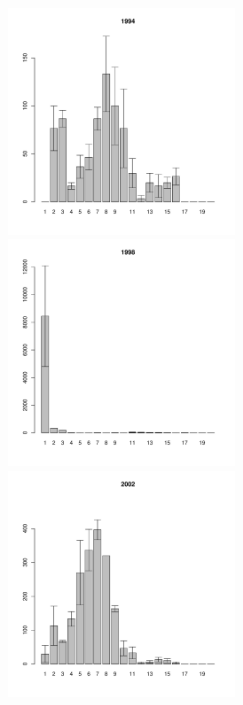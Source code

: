 \begin{figure}[h]
\begin{multicols}{3}
\hfill
\includegraphics[width=60mm]{../White_Sea/Estuatiy_Luvenga/sizestr_1994_.pdf}
\hfill
\includegraphics[width=60mm]{../White_Sea/Estuatiy_Luvenga/sizestr_1998_.pdf}
\hfill
\includegraphics[width=60mm]{../White_Sea/Estuatiy_Luvenga/sizestr_2002_.pdf}
\end{multicols}



\end{figure}
